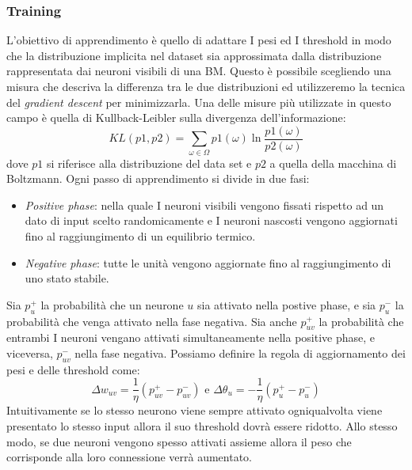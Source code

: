 \documentclass{article}
\begin{document}
\subsubsection{Training}
L'obiettivo di apprendimento è quello di adattare I pesi ed I threshold in modo che la
distribuzione implicita nel dataset sia approssimata dalla distribuzione rappresentata dai
neuroni visibili di una BM.
\newline\newline
Questo è possibile scegliendo una misura che descriva la differenza tra le due distribuzioni
ed utilizzeremo la tecnica del \textit{gradient descent} per minimizzarla. Una delle misure più
utilizzate in questo campo è quella di Kullback-Leibler sulla divergenza dell'informazione:
$$KL(p1,p2)= \sum_{\omega\in\Omega}p1(\omega)\ln\frac{p1(\omega)}{p2(\omega)}$$
dove $p1$ si riferisce alla distribuzione del data set e $p2$ a quella della macchina di Boltzmann.
Ogni passo di apprendimento si divide in due fasi:
\begin{itemize}
    \item \textit{Positive phase}: nella quale I neuroni visibili vengono fissati rispetto ad un
          dato di input scelto randomicamente e I neuroni nascosti vengono aggiornati fino
          al raggiungimento di un equilibrio termico.
    \item \textit{Negative phase}: tutte le unità vengono aggiornate fino al raggiungimento di
          uno stato stabile.
\end{itemize}

Sia $p_u^+$ la probabilità che un neurone $u$ sia attivato nella postive phase, e sia $p_u^-$
la probabilità che venga attivato nella fase negativa. Sia anche $p_{uv}^+$ la probabilità
che entrambi I neuroni vengano attivati simultaneamente nella positive phase, e viceversa,
$p_{uv}^-$ nella fase negativa. Possiamo definire la regola di aggiornamento dei pesi
e delle threshold come:
$$\Delta w_{uv}=\frac{1}{\eta}(p_{uv}^+ - p_{uv}^-)\text{ e }\Delta\theta_u =-\frac{1}{\eta}(p_u^+ - p_u^-)$$
Intuitivamente se lo stesso neurono viene sempre attivato ogniqualvolta viene presentato lo stesso
input allora il suo threshold dovrà essere ridotto. Allo stesso modo, se due neuroni vengono
spesso attivati assieme allora il peso che corrisponde alla loro connessione verrà aumentato.
\end{document}
